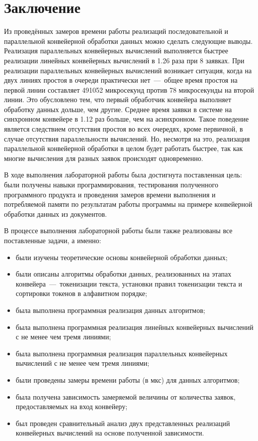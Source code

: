 \chapter*{Заключение}
Из проведённых замеров времени работы реализаций последовательной и параллельной конвейерной обработки данных можно сделать следующие выводы.
Реализация параллельных конвейерных вычислений выполняется быстрее реализации линейных конвейерных вычислений в 1.26 раза при 8 заявках.
При реализации параллельных конвейерных вычислений возникает ситуация, когда на двух линиях простоя в очереди практически нет~---~общее время простоя на первой линии составляет 491052 микросекунд против 78 микросекунды на второй линии. Это обусловлено тем, что первый обработчик конвейера выполняет обработку данных дольше, чем другие. 
Среднее время заявки в системе на синхронном конвейере в 1.12 раз больше, чем на асинхронном. Такое поведение является следствием отсутствия простоя во всех очередях, кроме первичной, в случае отсутствия параллельности вычислений. Но, несмотря на это, реализация параллельной конвейерной обработки в целом будет работать быстрее, так как многие вычисления для разных заявок происходят одновременно.

В ходе выполнения лабораторной работы была достигнута поставленная цель: были получены навыки программирования, тестирования полученного программного продукта и проведения замеров времени выполнения и потребляемой памяти по результатам работы программы на примере конвейерной обработки данных из документов.

В процессе выполнения лабораторной работы были также реализованы все поставленные задачи, а именно:
\begin{itemize}
	\item были изучены теоретические основы конвейерной обработки данных;
	\item были описаны алгоритмы обработки данных, реализованных на этапах конвейера~---~токенизации текста, установки правил токенизации текста и сортировки токенов в алфавитном порядке;
	\item была выполнена программная реализация данных алгоритмов;
	\item была выполнена программная реализация линейных конвейерных вычислений с не менее чем тремя линиями;
	\item была выполнена программная реализация параллельных конвейерных вычислений с не менее чем тремя линиями;
	\item были проведены замеры времени работы (в мкс) для данных алгоритмов;
	\item была получена зависимость замеряемой величины от количества заявок, предоставляемых на вход конвейеру;
	\item был проведен сравнительный анализ двух представленных реализаций конвейерных вычислений на основе полученной зависимости.
\end{itemize}

\newpage